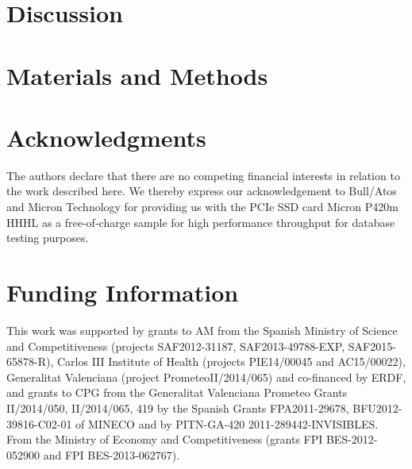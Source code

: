 \documentclass[12pt,oneside,letterpaper]{article}
\begin{document}
\section*{Discussion}

\section*{Materials and Methods}
   

\section*{Acknowledgments}
The authors declare that there are no competing financial interests in relation to the work described here. We thereby express our acknowledgement to Bull/Atos and Micron Technology for providing us with the PCIe SSD card Micron P420m HHHL as a free-of-charge sample for high performance throughput for database testing purposes.

\section*{Funding Information}
This work was supported by grants to AM from the Spanish Ministry of Science and Competitiveness (projects SAF2012-31187, SAF2013-49788-EXP, SAF2015-65878-R), Carlos III Institute of Health (projects PIE14/00045 and AC15/00022), Generalitat Valenciana (project PrometeoII/2014/065) and co-financed by ERDF, and grants to CPG from the Generalitat Valenciana Prometeo Grants II/2014/050, II/2014/065, 419 by the Spanish Grants FPA2011-29678, BFU2012-39816-C02-01 of MINECO and by PITN-GA-420 2011-289442-INVISIBLES. From the Ministry of Economy and Competitiveness (grants FPI BES-2012-052900 and FPI BES-2013-062767).

\end{document}
